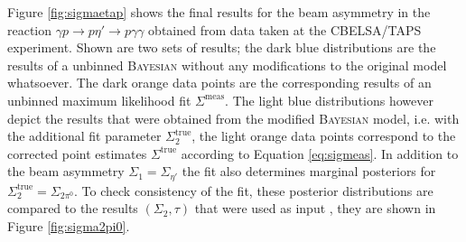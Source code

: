 Figure \ref{fig:sigmaetap} shows the final results for the beam asymmetry in the reaction $\gamma p \to p\eta' \to p\gamma\gamma$ obtained from data taken at the CBELSA/TAPS experiment. Shown are two sets of results; the dark blue distributions are the results of a unbinned \textsc{Bayesian} without any modifications to the original model whatsoever. The dark orange data points are the corresponding results of an unbinned maximum likelihood fit $\Sigma^\text{meas}$. The light blue distributions however depict the results that were obtained from the modified \textsc{Bayesian} model, i.e. with the additional fit parameter $\Sigma_2^\text{true}$, the light orange data points correspond to the corrected point estimates $\Sigma^\text{true}$ according to Equation \eqref{eq:sigmeas}. In addition to the beam asymmetry $\Sigma_1=\Sigma_{\eta'}$ the fit also determines marginal posteriors for $\Sigma_2^\text{true}=\Sigma_{2\pi^0}$. To check consistency of the fit, these posterior distributions are compared to the results $\left(\Sigma_2,\tau\right)$ that were used as input \cite{mahlbergphd}, they are shown in Figure \ref{fig:sigma2pi0}. 

